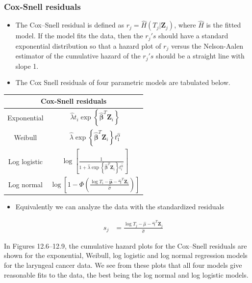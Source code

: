 \documentclass[10pt]{article}\usepackage[]{graphicx}\usepackage[]{xcolor}
\theoremstyle{definition}
\providecommand{\tabularnewline}{\\}
\numberwithin{equation}{subsection}
\numberwithin{figure}{section}
\numberwithin{table}{subsection}
\numberwithin{Report}{section}
\numberwithin{Example}{subsection}
\begin{document}
\subsubsection{Cox-Snell residuals}
\begin{itemize}
\item The Cox–Snell residual is defined as $r_{j}=\widehat{H}(T_{j}|\mathbf{Z}_{j})$, where $\widehat{H}$
is the fitted model. If the model fits the data, then the $r_{j}'s$
should have a standard exponential distribution so that a hazard plot
of $r_{j}$ versus the Nelson-Aalen estimator of the cumulative hazard
of the $r_{j}'s$ should be a straight line with slope 1.
\item The Cox Snell residuals of four parametric models are tabulated below.
\end{itemize}
\begin{center}


\begin{tabular}{|c|c|}
\hline 
\multicolumn{2}{|c}{Cox-Snell residuals}\tabularnewline
\hline 
\hline 
Exponential &
$\widehat{\lambda}t_{i}\exp\left\{ \widehat{\mathbf{\beta}}^{T}\mathbf{Z}_{i}\right\} $\tabularnewline
\hline 
Weibull &
$\widehat{\lambda}\exp\left\{ \mathbf{\widehat{\beta}}^{T}\mathbf{Z}_{i}\right\} t_{1}^{\widehat{\alpha}}$\tabularnewline
\hline 
Log logistic &
$\log\left[\frac{1}{1+\widehat{\lambda}\exp\left\{ \widehat{\mathbf{\beta}}^{T}\mathbf{Z}_{i}\right\} t_{i}^{\widehat{\alpha}}}\right]$\tabularnewline
\hline 
Log normal &
$\log\left[1-\Phi\left(\frac{\log T_{i}-\mathbf{\widehat{\mu}}-\mathbf{\widehat{\gamma}}^{T}\mathbf{Z}_{i}}{\widehat{\sigma}}\right)\right]$\tabularnewline
\hline 
\end{tabular}

\end{center}
\begin{itemize}


\item Equivalently we can analyze the data with the standardized residuals


\begin{align*}
s_{j} & =\frac{\log T_{j}-\widehat{\mu}-\mathbf{\widehat{\gamma}}^{T}\mathbf{Z}_{j}}{\widehat{\sigma}}
\end{align*}


\end{itemize}


\noindent In Figures 12.6–12.9, the cumulative hazard plots for the Cox–Snell residuals are shown for the exponential, Weibull, log logistic and log normal regression models for the laryngeal cancer data. We see from these plots that all four models give reasonable fits to the data, the best being the log normal and log logistic models.
\end{document}
